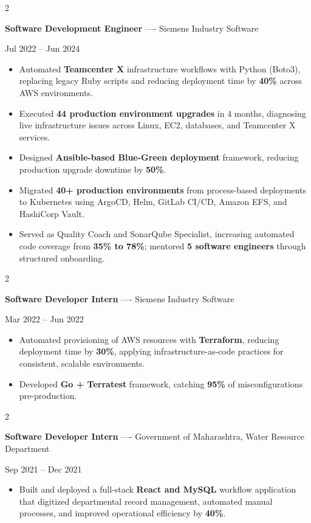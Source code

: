 \documentclass[10pt, letterpaper]{article}
\newenvironment{highlights}{
    \begin{itemize}[
        topsep=0.10 cm,
        parsep=0.06 cm,
        partopsep=0pt,
        itemsep=0.06 cm,
        leftmargin=12pt
    ]
}{
    \end{itemize}
}
\newenvironment{twocolentry}[2][]{
    \onecolentry
    \def\secondColumn{#2}
    \setcolumnwidth{\fill, 4.5 cm}
    \begin{paracol}{2}
}{
    \switchcolumn \raggedleft \secondColumn
    \end{paracol}
    \endonecolentry
}
\begin{document}
\vspace{0.15 cm}

\begin{twocolentry}{Jul 2022 -- Jun 2024}
\textbf{Software Development Engineer} ---- Siemens Industry Software
\end{twocolentry}
\begin{highlights}
  \item Automated \textbf{Teamcenter X} infrastructure workflows with Python (Boto3), replacing legacy Ruby scripts and reducing deployment time by \textbf{40\%} across AWS environments.
  \item Executed \textbf{44 production environment upgrades} in 4 months, diagnosing live infrastructure issues across Linux, EC2, databases, and Teamcenter X services.
  \item Designed \textbf{Ansible-based Blue-Green deployment} framework, reducing production upgrade downtime by \textbf{50\%}.
  \item Migrated \textbf{40+ production environments} from process-based deployments to Kubernetes using ArgoCD, Helm, GitLab CI/CD, Amazon EFS, and HashiCorp Vault.
  \item Served as Quality Coach and SonarQube Specialist, increasing automated code coverage from \textbf{35\% to 78\%}; mentored \textbf{5 software engineers} through structured onboarding.
\end{highlights}

\vspace{0.15 cm}

\begin{twocolentry}{Mar 2022 -- Jun 2022}
\textbf{Software Developer Intern} ---- Siemens Industry Software
\end{twocolentry}
\begin{highlights}
  \item Automated provisioning of AWS resources with \textbf{Terraform}, reducing deployment time by \textbf{30\%}, applying infrastructure-as-code practices for consistent, scalable environments.
  \item Developed \textbf{Go + Terratest} framework, catching \textbf{95\%} of misconfigurations pre-production.
\end{highlights}

\vspace{0.15 cm}

\begin{twocolentry}{Sep 2021 -- Dec 2021}
\textbf{Software Developer Intern} ---- Government of Maharashtra, Water Resource Department
\end{twocolentry}
\begin{highlights}
  \item Built and deployed a full-stack \textbf{React and MySQL} workflow application that digitized departmental record management, automated manual processes, and improved operational efficiency by \textbf{40\%}.
\end{highlights}
\end{document}
